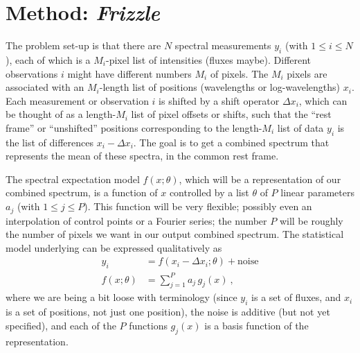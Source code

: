 \documentclass[modern, linenumbers]{aastex631}
\newcommand{\name}{\textsl{Frizzle}}
\begin{document}
\section{Method: \name}\label{sec:method}

The problem set-up is that there are $N$ spectral measurements $y_i$ (with $1\leq i\leq N$), each of which is a $M_i$-pixel list of intensities (fluxes maybe).
Different observations $i$ might have different numbers $M_i$ of pixels.
The $M_i$ pixels are associated with an $M_i$-length list of positions (wavelengths or log-wavelengths) $x_i$.
Each measurement or observation $i$ is shifted by a shift operator $\Delta x_i$, which can be thought of as a length-$M_i$ list of pixel offsets or shifts, such that the ``rest frame'' or ``unshifted'' positions corresponding to the length-$M_i$ list of data $y_i$ is the list of differences $x_i - \Delta x_i$.
The goal is to get a combined spectrum that represents the mean of these spectra, in the common rest frame.

The spectral expectation model $f(x;\theta)$, which will be a representation of our combined spectrum, is a function of $x$ controlled by a list $\theta$ of $P$ linear parameters $a_j$ (with $1\leq j\leq P$).
This function will be very flexible; possibly even an interpolation of control points or a Fourier series; the number $P$ will be roughly the number of pixels we want in our output combined spectrum.
The statistical model underlying can be expressed qualitatively as
\begin{align}
    y_i &= f(x_i - \Delta x_i;\theta) + \mbox{noise} \\
    f(x;\theta) &= \sum_{j=1}^P a_j\,g_j(x) ~,
\end{align}
where we are being a bit loose with terminology (since $y_i$ is a set of fluxes, and $x_i$ is a set of positions, not just one position), the noise is additive (but not yet specified), and each of the $P$ functions $g_j(x)$ is a basis function of the representation.
\end{document}
